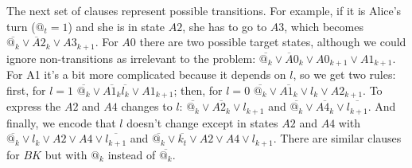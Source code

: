 The next set of clauses represent possible transitions.  For example, if it is
Alice's turn ($@_t = 1$) and she is in state $A2$, she has to go to $A3$, which becomes
$\overline{@_k} \vee {\overline A2_k} \vee A3_{k+1}$.  For $A0$ there are two possible
target states, although we could ignore non-transitions as irrelevant to the problem:
$\overline{@_k} \vee {\overline A0_k} \vee A0_{k+1} \vee A1_{k+1}$.  For A1 it's a bit more
complicated because it depends on $l$, so we get two rules: first, for $l=1$
$\overline{@_k} \vee \overline{A1_{k}} \overline{l_k} \vee A1_{k+1}$; then, for $l=0$
$\overline{@_k} \vee \overline{A1_{k}} \vee l_k \vee A2_{k+1}$.  To express the $A2$ and $A4$
changes to $l$: $\overline{@_k} \vee \overline{A2_k} \vee l_{k+1}$ and
$\overline{@_k} \vee \overline{A4_k} \vee \overline{l_{k+1}}$.  And finally, we encode
that $l$ doesn't change except in states $A2$ and $A4$ with
$\overline{@_k} \vee l_k \vee A2 \vee A4 \vee \overline{l_{k+1}}$
and $\overline{@_k} \vee \overline{k_t} \vee A2 \vee A4 \vee l_{k+1}$.
There are similar clauses for $BK$ but with $@_k$ instead of $\overline{@_k}$.

